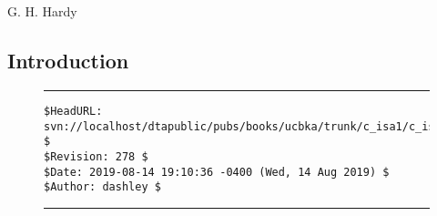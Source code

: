 
\chapter{\cisaonelongtitle{}}

\label{cisa1}

                   {G. H. Hardy \cite[p.85]{bibref:b:mathematiciansapology:1940}}

\section{Introduction}
\label{cisa1:sint}


\noindent\begin{figure}[!b]
\noindent\rule[-0.25in]{\textwidth}{1pt}
\begin{tiny}
\begin{verbatim}
$HeadURL: svn://localhost/dtapublic/pubs/books/ucbka/trunk/c_isa1/c_isa1.tex $
$Revision: 278 $
$Date: 2019-08-14 19:10:36 -0400 (Wed, 14 Aug 2019) $
$Author: dashley $
\end{verbatim}
\end{tiny}
\noindent\rule[0.25in]{\textwidth}{1pt}
\end{figure}

%
